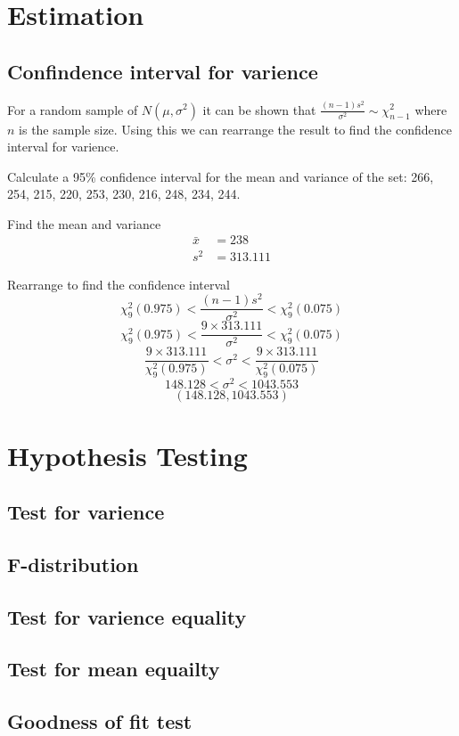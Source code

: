 \newpage
\section{Estimation}

    \newpage
    \subsection{Confindence interval for varience}
        For a random sample of $N(\mu, \sigma^2)$ it can be shown that $\displaystyle\frac{(n-1)s^2}{\sigma^2} \sim \chi^2_{n-1}$ where $n$ is the sample size. Using this we can rearrange the result to find the confidence interval for varience.

        \begin{example}
        {
            Calculate a 95\% confidence interval for the mean and variance of the set: 266, 254, 215, 220, 253, 230, 216, 248, 234, 244.
        }

        \begin{step}{Find the mean and variance}
        \begin{align*}
        \bar{x} &= 238 \\
        s^2 &= 313.111
        \end{align*}
        \end{step}

        \begin{step}{Rearrange to find the confidence interval}
        $$\chi^2_9(0.975) < \frac{(n-1)s^2}{\sigma^2} < \chi^2_9(0.075)$$
        $$\chi^2_9(0.975) < \frac{9 \times 313.111}{\sigma^2} < \chi^2_9(0.075)$$
        $$\frac{9 \times 313.111}{\chi^2_9(0.975)} < \sigma^2 < \frac{9 \times 313.111}{\chi^2_9(0.075)}$$
        $$148.128 < \sigma^2 < 1043.553$$
        $$(148.128, 1043.553)$$
        \end{step}

        \end{example}

\newpage
\section{Hypothesis Testing}

    \newpage
    \subsection{Test for varience}
    
    \newpage
    \subsection{F-distribution}
    
    \newpage
    \subsection{Test for varience equality}
    
    \newpage
    \subsection{Test for mean equailty}
    
    \newpage
    \subsection{Goodness of fit test}
